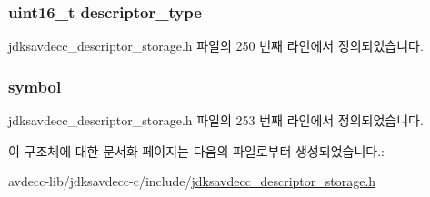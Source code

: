 \subsubsection[{\texorpdfstring{descriptor\+\_\+type}{descriptor_type}}]{\setlength{\rightskip}{0pt plus 5cm}uint16\+\_\+t descriptor\+\_\+type}\hypertarget{structjdksavdecc__descriptor__storage__symbol_ab7c32b6c7131c13d4ea3b7ee2f09b78d}{}\label{structjdksavdecc__descriptor__storage__symbol_ab7c32b6c7131c13d4ea3b7ee2f09b78d}


jdksavdecc\+\_\+descriptor\+\_\+storage.\+h 파일의 250 번째 라인에서 정의되었습니다.

\subsubsection[{\texorpdfstring{symbol}{symbol}}]{ symbol}\hypertarget{structjdksavdecc__descriptor__storage__symbol_a0a81ee27053a63e71a6c7db060562eb0}{}\label{structjdksavdecc__descriptor__storage__symbol_a0a81ee27053a63e71a6c7db060562eb0}


jdksavdecc\+\_\+descriptor\+\_\+storage.\+h 파일의 253 번째 라인에서 정의되었습니다.



이 구조체에 대한 문서화 페이지는 다음의 파일로부터 생성되었습니다.\+:\begin{DoxyCompactItemize}
\item 
avdecc-\/lib/jdksavdecc-\/c/include/\hyperlink{jdksavdecc__descriptor__storage_8h}{jdksavdecc\+\_\+descriptor\+\_\+storage.\+h}\end{DoxyCompactItemize}
